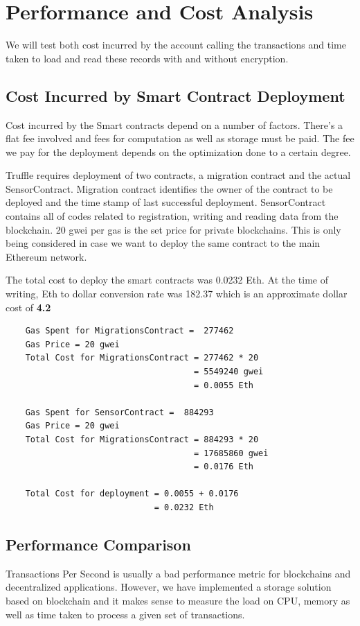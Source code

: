 \documentclass[11pt,openright]{report}
\begin{document}
\chapter{Performance and Cost Analysis}
\label{chapter:experiment_results}
We will test both cost incurred by the account calling the transactions and time taken to load and read these records with and without encryption.

\section{Cost Incurred by Smart Contract Deployment}
Cost incurred by the Smart contracts depend on a number of factors. There's a flat fee involved and fees for computation as well as storage must be paid. The fee we pay for the deployment depends on the optimization done to a certain degree. 

Truffle requires deployment of two contracts, a migration contract and the actual SensorContract. Migration contract identifies the owner of the contract to be deployed and the time stamp of last successful deployment. SensorContract contains all of codes related to registration, writing and reading data from the blockchain. 20 gwei per gas is the set price for private blockchains. This is only being considered in case we want to deploy the same contract to the main Ethereum network.

The total cost to deploy the smart contracts was 0.0232 Eth. At the time of writing, Eth to dollar conversion rate was 182.37 which is an approximate dollar cost of \textbf{ 4.2}

\begin{verbatim}
    Gas Spent for MigrationsContract =  277462
    Gas Price = 20 gwei
    Total Cost for MigrationsContract = 277462 * 20
                                      = 5549240 gwei
                                      = 0.0055 Eth
    
    Gas Spent for SensorContract =  884293
    Gas Price = 20 gwei
    Total Cost for MigrationsContract = 884293 * 20
                                      = 17685860 gwei
                                      = 0.0176 Eth                           
    
    Total Cost for deployment = 0.0055 + 0.0176
                              = 0.0232 Eth
\end{verbatim}

\section{Performance Comparison}
Transactions Per Second is usually a bad performance metric for blockchains and decentralized applications. However, we have implemented a storage solution based on blockchain and it makes sense to measure the load on CPU, memory as well as time taken to process a given set of transactions.
\end{document}
